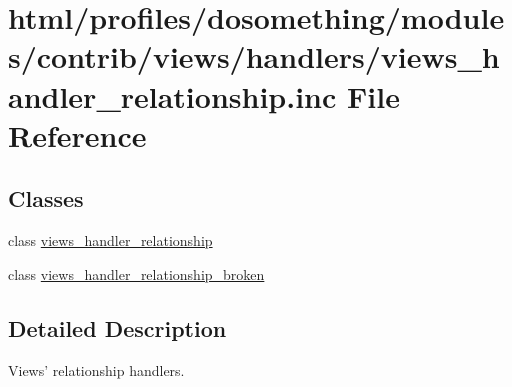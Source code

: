 \hypertarget{views__handler__relationship_8inc}{
\section{html/profiles/dosomething/modules/contrib/views/handlers/views\_\-handler\_\-relationship.inc File Reference}
\label{views__handler__relationship_8inc}
}
\subsection*{Classes}
\begin{DoxyCompactItemize}
\item 
class \hyperlink{classviews__handler__relationship}{views\_\-handler\_\-relationship}
\item 
class \hyperlink{classviews__handler__relationship__broken}{views\_\-handler\_\-relationship\_\-broken}
\end{DoxyCompactItemize}


\subsection{Detailed Description}
Views' relationship handlers. 